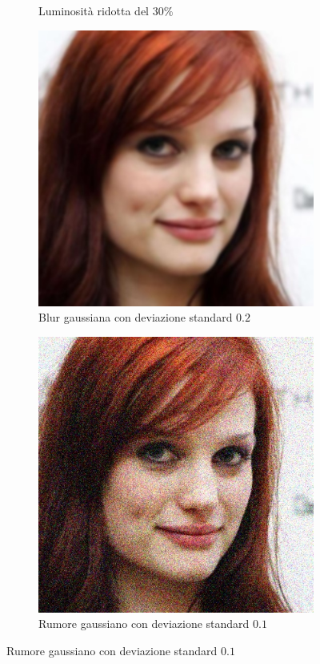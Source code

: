 \begin{figure}[ht]
\begin{subfigure}{0.2\textwidth}
\caption{Luminosità ridotta del $30\%$}
\label{sfig:corruption_brightness}
\end{subfigure}\hfill
\begin{subfigure}{0.2\textwidth}
\includegraphics[width=\textwidth]{./Images/gaussian_blur_severity_2.0.jpg}
\caption{Blur gaussiana con deviazione standard $0.2$}
\label{sfig:corruption_gaussian_blur}
\end{subfigure}\hfill
\begin{subfigure}{0.2\textwidth}
\includegraphics[width=\textwidth]{./Images/gaussian_noise_severity_0.1.jpg}
\caption{Rumore gaussiano con deviazione standard $0.1$}
\label{sfig:corruption_gaussian_noise}
\end{subfigure}\hfill


\end{figure}
